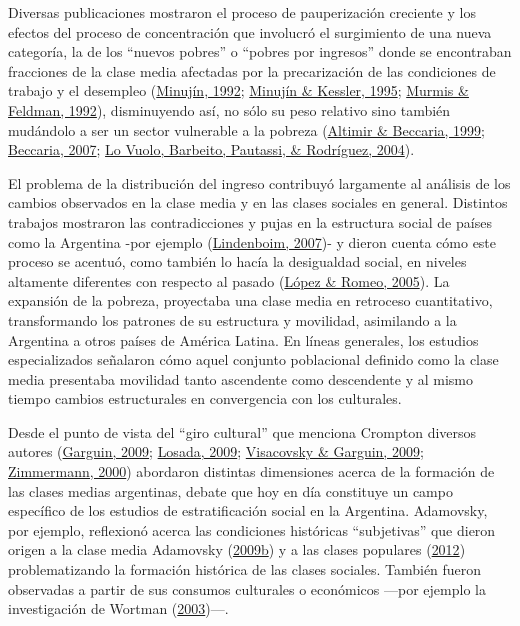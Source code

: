 \documentclass[
]{article}
\begin{document}
Diversas publicaciones mostraron el proceso de pauperización creciente y los efectos del proceso de concentración que involucró el surgimiento de una nueva categoría, la de los ``nuevos pobres'' o ``pobres por ingresos'' donde se encontraban fracciones de la clase media afectadas por la precarización de las condiciones de trabajo y el desempleo (\protect\hyperlink{ref-Minujin1992}{Minujín, 1992}; \protect\hyperlink{ref-Minujin1995}{Minujín \& Kessler, 1995}; \protect\hyperlink{ref-Murmis1992}{Murmis \& Feldman, 1992}), disminuyendo así, no sólo su peso relativo sino también mudándolo a ser un sector vulnerable a la pobreza (\protect\hyperlink{ref-Altimir1999}{Altimir \& Beccaria, 1999}; \protect\hyperlink{ref-Beccaria2007}{Beccaria, 2007}; \protect\hyperlink{ref-LoVuolo2004c}{Lo Vuolo, Barbeito, Pautassi, \& Rodríguez, 2004}).

El problema de la distribución del ingreso contribuyó largamente al análisis de los cambios observados en la clase media y en las clases sociales en general. Distintos trabajos mostraron las contradicciones y pujas en la estructura social de países como la Argentina -por ejemplo (\protect\hyperlink{ref-Lindenboim2007}{Lindenboim, 2007})- y dieron cuenta cómo este proceso se acentuó, como también lo hacía la desigualdad social, en niveles altamente diferentes con respecto al pasado (\protect\hyperlink{ref-Lopez2005a}{López \& Romeo, 2005}). La expansión de la pobreza, proyectaba una clase media en retroceso cuantitativo, transformando los patrones de su estructura y movilidad, asimilando a la Argentina a otros países de América Latina. En líneas generales, los estudios especializados señalaron cómo aquel conjunto poblacional definido como la clase media presentaba movilidad tanto ascendente como descendente y al mismo tiempo cambios estructurales en convergencia con los culturales.

Desde el punto de vista del ``giro cultural'' que menciona Crompton diversos autores (\protect\hyperlink{ref-Garguin2009}{Garguin, 2009}; \protect\hyperlink{ref-Losada2009}{Losada, 2009}; \protect\hyperlink{ref-Visacovsky2009}{Visacovsky \& Garguin, 2009}; \protect\hyperlink{ref-Zimmermann2000}{Zimmermann, 2000}) abordaron distintas dimensiones acerca de la formación de las clases medias argentinas, debate que hoy en día constituye un campo específico de los estudios de estratificación social en la Argentina. Adamovsky, por ejemplo, reflexionó acerca las condiciones históricas ``subjetivas'' que dieron origen a la clase media Adamovsky (\protect\hyperlink{ref-Adamovsky2009b}{2009b}) y a las clases populares (\protect\hyperlink{ref-Adamovsky2012}{2012}) problematizando la formación histórica de las clases sociales. También fueron observadas a partir de sus consumos culturales o económicos ---por ejemplo la investigación de Wortman (\protect\hyperlink{ref-Wortman2003}{2003})---.
\end{document}
